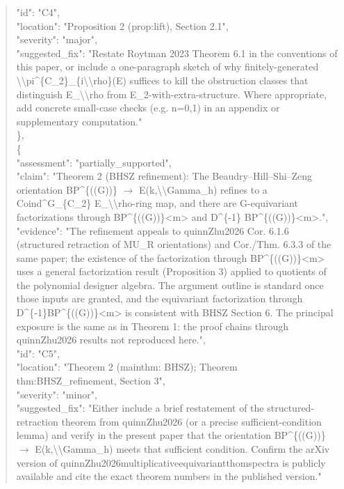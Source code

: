 \documentclass[11pt]{article}
\begin{document}
\begin{quote}
      "id": "C4",\\
      "location": "Proposition 2 (prop:lift), Section 2.1",\\
      "severity": "major",\\
      "suggested\_fix": "Restate Roytman 2023 Theorem 6.1 in the conventions of this paper, or include a one-paragraph sketch of why finitely-generated \textbackslash{}\textbackslash{}pi\^{}\{C\_2\}\_\{i\textbackslash{}\textbackslash{}rho\}(E) suffices to kill the obstruction classes that distinguish E\_\textbackslash{}\textbackslash{}rho from E\_2-with-extra-structure. Where appropriate, add concrete small-case checks (e.g. n=0,1) in an appendix or supplementary computation."\\
    \},\\
    \{\\
      "assessment": "partially\_supported",\\
      "claim": "Theorem 2 (BHSZ refinement): The Beaudry--Hill--Shi--Zeng orientation BP\^{}\{((G))\} \ensuremath{\to} E(k,\textbackslash{}\textbackslash{}Gamma\_h) refines to a Coind\^{}G\_\{C\_2\} E\_\textbackslash{}\textbackslash{}rho-ring map, and there are G-equivariant factorizations through BP\^{}\{((G))\}<m> and D\^{}\{-1\} BP\^{}\{((G))\}<m>.",\\
      "evidence": "The refinement appeals to quinnZhu2026 Cor. 6.1.6 (structured retraction of MU\_R orientations) and Cor./Thm. 6.3.3 of the same paper; the existence of the factorization through BP\^{}\{((G))\}<m> uses a general factorization result (Proposition 3) applied to quotients of the polynomial designer algebra. The argument outline is standard once those inputs are granted, and the equivariant factorization through D\^{}\{-1\}BP\^{}\{((G))\}<m> is consistent with BHSZ Section 6. The principal exposure is the same as in Theorem 1: the proof chains through quinnZhu2026 results not reproduced here.",\\
      "id": "C5",\\
      "location": "Theorem 2 (mainthm: BHSZ); Theorem thm:BHSZ\_refinement, Section 3",\\
      "severity": "minor",\\
      "suggested\_fix": "Either include a brief restatement of the structured-retraction theorem from quinnZhu2026 (or a precise sufficient-condition lemma) and verify in the present paper that the orientation BP\^{}\{((G))\} \ensuremath{\to} E(k,\textbackslash{}\textbackslash{}Gamma\_h) meets that sufficient condition. Confirm the arXiv version of quinnZhu2026multiplicativeequivariantthomspectra is publicly available and cite the exact theorem numbers in the published version."\\

\end{quote}
\end{document}
